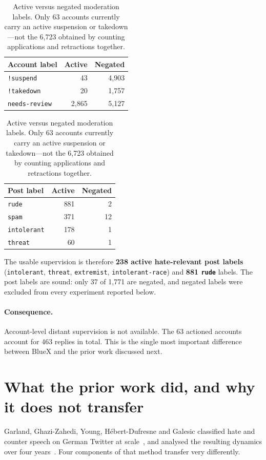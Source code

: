 \documentclass[11pt,a4paper]{article}
\begin{document}
\begin{table}[h]
\centering
\begin{tabular}{lrr}
\toprule
Account label & Active & Negated \\
\midrule
\texttt{!suspend}     &   43 & 4{,}903 \\
\texttt{!takedown}    &   20 & 1{,}757 \\
\texttt{needs-review} & 2{,}865 & 5{,}127 \\
\bottomrule
\end{tabular}
\hspace{1cm}
\begin{tabular}{lrr}
\toprule
Post label & Active & Negated \\
\midrule
\texttt{rude}        & 881 &  2 \\
\texttt{spam}        & 371 & 12 \\
\texttt{intolerant}  & 178 &  1 \\
\texttt{threat}      &  60 &  1 \\
\bottomrule
\end{tabular}
\caption{Active versus negated moderation labels. Only 63 accounts currently carry
an active suspension or takedown---not the 6{,}723 obtained by counting
applications and retractions together.}
\end{table}

The usable supervision is therefore \textbf{238 active hate-relevant post labels}
(\texttt{intolerant}, \texttt{threat}, \texttt{extremist},
\texttt{intolerant-race}) and \textbf{881 \texttt{rude}} labels. The post labels are
sound: only 37 of 1{,}771 are negated, and negated labels were excluded from every
experiment reported below.

\paragraph{Consequence.} Account-level distant supervision is not available. The 63
actioned accounts account for 463 replies in total. This is the single most
important difference between BlueX and the prior work discussed next.

\section{What the prior work did, and why it does not transfer}

Garland, Ghazi-Zahedi, Young, H\'ebert-Dufresne and Galesic classified hate and
counter speech on German Twitter at scale~\cite{garland2020countering}, and analysed
the resulting dynamics over four years~\cite{garland2020impact}. Four components of
that method transfer very differently.
\end{document}
